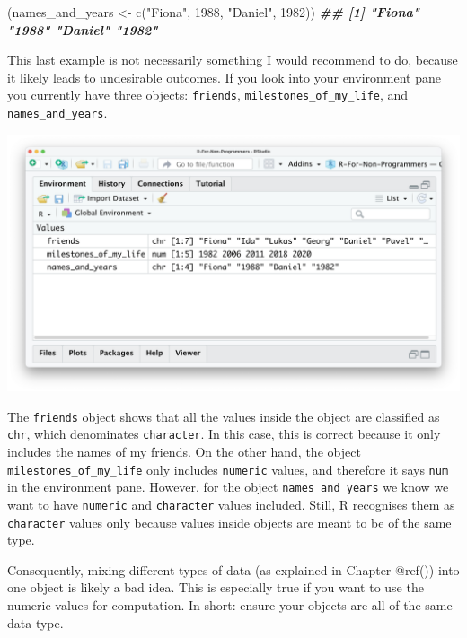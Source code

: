 \documentclass[
]{book}
\newenvironment{Shaded}{\begin{snugshade}}{\end{snugshade}}
\newcommand{\DecValTok}[1]{\textcolor[rgb]{0.00,0.00,0.81}{#1}}
\newcommand{\DocumentationTok}[1]{\textcolor[rgb]{0.56,0.35,0.01}{\textbf{\textit{#1}}}}
\newcommand{\FunctionTok}[1]{\textcolor[rgb]{0.00,0.00,0.00}{#1}}
\newcommand{\NormalTok}[1]{#1}
\newcommand{\OtherTok}[1]{\textcolor[rgb]{0.56,0.35,0.01}{#1}}
\newcommand{\StringTok}[1]{\textcolor[rgb]{0.31,0.60,0.02}{#1}}
\begin{document}
\begin{Shaded}
\begin{Highlighting}[]
\NormalTok{(names\_and\_years }\OtherTok{\textless{}{-}} \FunctionTok{c}\NormalTok{(}\StringTok{"Fiona"}\NormalTok{, }\DecValTok{1988}\NormalTok{, }\StringTok{"Daniel"}\NormalTok{, }\DecValTok{1982}\NormalTok{))}
\DocumentationTok{\#\# [1] "Fiona"  "1988"   "Daniel" "1982"}
\end{Highlighting}
\end{Shaded}

This last example is not necessarily something I would recommend to do, because it likely leads to undesirable outcomes. If you look into your environment pane you currently have three objects: \texttt{friends}, \texttt{milestones\_of\_my\_life}, and \texttt{names\_and\_years}.

\includegraphics{images/chapter_05_img/01_basic_computation_environment_objects.png}

The \texttt{friends} object shows that all the values inside the object are classified as \texttt{chr}, which denominates \texttt{character}. In this case, this is correct because it only includes the names of my friends. On the other hand, the object \texttt{milestones\_of\_my\_life} only includes \texttt{numeric} values, and therefore it says \texttt{num} in the environment pane. However, for the object \texttt{names\_and\_years} we know we want to have \texttt{numeric} and \texttt{character} values included. Still, R recognises them as \texttt{character} values only because values inside objects are meant to be of the same type.

Consequently, mixing different types of data (as explained in Chapter @ref()) into one object is likely a bad idea. This is especially true if you want to use the numeric values for computation. In short: ensure your objects are all of the same data type.
\end{document}
